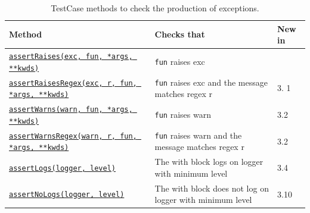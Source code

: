 \newpage
\begin{table}[h!t]
    \begin{tabularx}{\textwidth}{|l|X|l|}
        \hline
        Method & Checks that & New in\\
        \hline
        \href{https://docs.python.org/3/library/unittest.html\#unittest.TestCase.assertRaises}
             {\small \texttt{assertRaises(exc, fun, *args, **kwds)}} & \texttt{fun} raises exc & \\
        \hline
        \href{https://docs.python.org/3/library/unittest.html\#unittest.TestCase.assertRaisesRegex}
             {\small \texttt{assertRaisesRegex(exc, r, fun, *args, **kwds)}} & \texttt{fun} raises exc and the message matches regex r & 3. 1\\
        \hline
        \href{https://docs.python.org/3/library/unittest.html\#unittest.TestCase.assertWarns}
             {\small \texttt{assertWarns(warn, fun, *args, **kwds)}} & \texttt{fun} raises warn & 3.2 \\
        \hline
        \href{https://docs.python.org/3/library/unittest.html\#unittest.TestCase.assertWarnsRegex}
             {\small \texttt{assertWarnsRegex(warn, r, fun, *args, **kwds)}} & \texttt{fun} raises warn and the message matches regex r & 3.2 \\
        \hline
        \href{https://docs.python.org/3/library/unittest.html\#unittest.TestCase.assertLogs}
             {\small \texttt{assertLogs(logger, level)}} & The with block logs on logger with minimum level & 3.4 \\
        \hline
        \href{https://docs.python.org/3/library/unittest.html\#unittest.TestCase.assertNoLogs}
                {\small \texttt{assertNoLogs(logger, level)}} & The with block does not log on logger with minimum level & 3.10 \\
        \hline
    \end{tabularx}
    \caption{TestCase methods to check the production of exceptions.}
    \label{tab:exceptionassertmethods}
\end{table}

